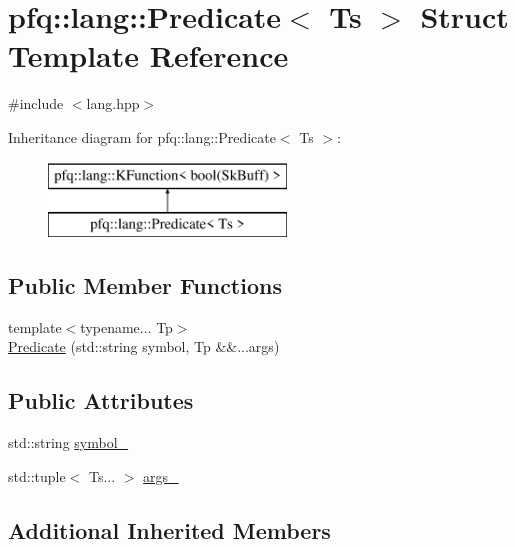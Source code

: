 \hypertarget{structpfq_1_1lang_1_1Predicate}{}\section{pfq\+:\+:lang\+:\+:Predicate$<$ Ts $>$ Struct Template Reference}
\label{structpfq_1_1lang_1_1Predicate}


{\ttfamily \#include $<$lang.\+hpp$>$}

Inheritance diagram for pfq\+:\+:lang\+:\+:Predicate$<$ Ts $>$\+:\begin{figure}[H]
\begin{center}
\leavevmode
\includegraphics[height=2.000000cm]{structpfq_1_1lang_1_1Predicate}
\end{center}
\end{figure}
\subsection*{Public Member Functions}
\begin{DoxyCompactItemize}
\item 
{\footnotesize template$<$typename... Tp$>$ }\\\hyperlink{structpfq_1_1lang_1_1Predicate_ad604e102c7599051e801d790cca70591}{Predicate} (std\+::string symbol, Tp \&\&...args)
\end{DoxyCompactItemize}
\subsection*{Public Attributes}
\begin{DoxyCompactItemize}
\item 
std\+::string \hyperlink{structpfq_1_1lang_1_1Predicate_a5f3219d34d216f1af9f6b1cafb93cc62}{symbol\+\_\+}
\item 
std\+::tuple$<$ Ts... $>$ \hyperlink{structpfq_1_1lang_1_1Predicate_aee302feb9cdf55566e50249e6dcd50af}{args\+\_\+}
\end{DoxyCompactItemize}
\subsection*{Additional Inherited Members}


